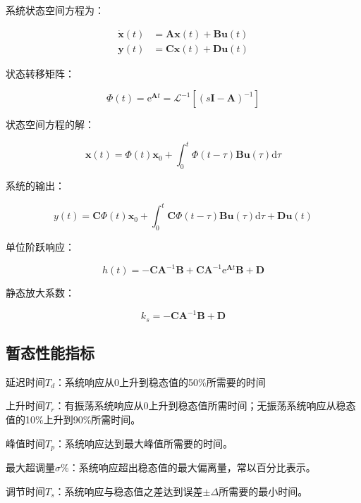 \documentclass[cn, blue, normal, 12pt]{elegantnote}
\begin{document}
系统状态空间方程为：

\begin{equation}
    \begin{aligned}
        \bm{\dot{x}}(t)&=\bm{Ax}(t)+\bm{Bu}(t) \\
        \bm{y}(t)&=\bm{Cx}(t)+\bm{Du}(t)
    \end{aligned}
\end{equation}

状态转移矩阵：

\begin{equation}
    \bm{\varPhi}(t)=\text{e}^{\bm{A}t}=\mathcal{L}^{-1}\left[(s\bm{I}-\bm{A})^{-1}\right]
\end{equation}

状态空间方程的解：

\begin{equation}
    \bm{x}(t)=\bm{\varPhi}(t)\bm{x}_0+\int_{0}^{t}\bm{\varPhi}(t-\tau)\bm{Bu}(\tau)\text{d}\tau
\end{equation}

系统的输出：

\begin{equation}
    y(t)=\bm{C\varPhi}(t)\bm{x}_0+\int_{0}^{t}\bm{C\varPhi}(t-\tau)\bm{Bu}(\tau)\text{d}\tau+\bm{Du}(t)
\end{equation}

单位阶跃响应：

\begin{equation}
    h(t)=-\bm{C}\bm{A}^{-1}\bm{B}+\bm{C}\bm{A}^{-1}\text{e}^{\bm{A}t}\bm{B}+\bm{D}
\end{equation}

静态放大系数：

\begin{equation}
    k_s=-\bm{C}\bm{A}^{-1}\bm{B}+\bm{D}
\end{equation}

\subsection{暂态性能指标}

延迟时间$T_d$：系统响应从0上升到稳态值的50\%所需要的时间

上升时间$T_r$：有振荡系统响应从0上升到稳态值所需时间；无振荡系统响应从稳态值的10\%上升到90\%所需时间。

峰值时间$T_p$：系统响应达到最大峰值所需要的时间。

最大超调量$\sigma\%$：系统响应超出稳态值的最大偏离量，常以百分比表示。

调节时间$T_s$：系统响应与稳态值之差达到误差$\pm\Delta$所需要的最小时间。
\end{document}
